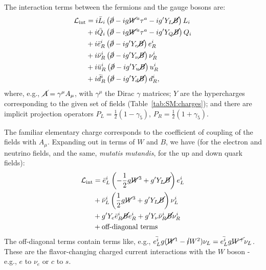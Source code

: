 The interaction terms between the fermions and the gauge bosons are:
\begin{align}
\mathcal{L}_\text{int} &= i\bar{L}_i\left(\cancel{\partial}-ig\cancel{W}^a\tau^a-ig'Y_L\cancel{B}\right)L_i\nonumber\\
            &+ i\bar{Q}_i\left(\cancel{\partial}-ig\cancel{W}^a\tau^a-ig'Y_Q\cancel{B}\right)Q_i\nonumber\\
              &+ i\bar{e}_R^i\left(\cancel{\partial}-ig'Y_e\cancel{B}\right)e_R^i\nonumber\\
              &+ i\bar{\nu}_R^i\left(\cancel{\partial}-ig'Y_\nu\cancel{B}\right)\nu_R^i\nonumber\\
              &+ i\bar{u}_R^i\left(\cancel{\partial}-ig'Y_u\cancel{B}\right)u_R^i\nonumber\\
              &+ i\bar{d}_R^i\left(\cancel{\partial}-ig'Y_d\cancel{B}\right)d_R^i,
\end{align}
where, e.g., $\cancel{A} = \gamma^\mu A_\mu$, with $\gamma^\mu$ the Dirac $\gamma$ matrices;
$Y$ are the hypercharges corresponding to the given set of fields (Table~\ref{tab:SM:charges});
and there are implicit projection operators $P_L = \frac{1}{2}(1-\gamma_5)$, $P_R = \frac{1}{2}(1+\gamma_5)$.

The familiar elementary charge corresponds to the coefficient of coupling of the fields with $A_\mu$.
Expanding out in terms of $W$ and $B$, we have (for the electron and neutrino fields, and the same, \textit{mutatis mutandis}, for the up and down quark fields):
\begin{align}
  \mathcal{L}_\text{int} &= \bar{e}_L^i\left(-\frac{1}{2}g\cancel{W}^3+g'Y_L\cancel{B}\right)e_L^i\nonumber\\
              &+ \bar{\nu}_L^i\left(\frac{1}{2}g\cancel{W}^3+g'Y_L\cancel{B}\right)\nu_L^i\nonumber\\
              &+ g' Y_e \bar{e}_R^i\cancel{B}e_R^i +g' Y_\nu \bar{\nu}_R^i\cancel{B}\nu_R^i\nonumber\\
              &+ \text{off-diagonal terms}
\end{align}
The off-diagonal terms contain terms like, e.g., $\bar{e_L^i}g(\cancel{W}^1-\cancel{i}W^2)\nu_L = \bar{e_L^i}g\cancel{W^+}\nu_L$.
These are the flavor-changing charged current interactions with the $W$ boson - e.g., $e$ to $\nu_e$ or $c$ to $s$.

